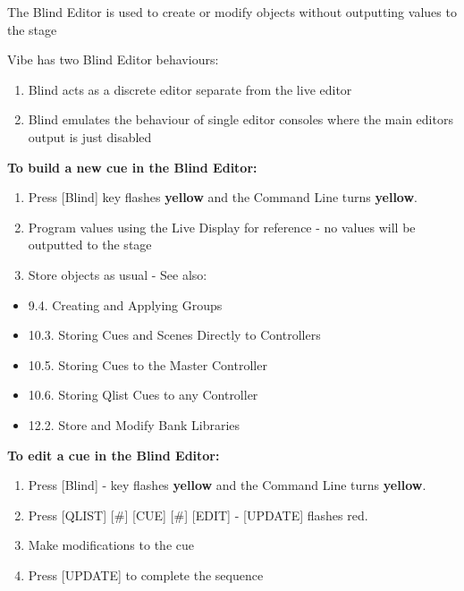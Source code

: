 \documentclass[
]{article}
\begin{document}
The Blind Editor is used to create or modify objects without outputting values to the stage

Vibe has two Blind Editor behaviours:

\begin{enumerate}
\def\labelenumi{\arabic{enumi}.}
\item
  Blind acts as a discrete editor separate from the live editor
\item
  Blind emulates the behaviour of single editor consoles where the main editors output is just disabled
\end{enumerate}

\textbf{To build a new cue in the Blind Editor:}

\begin{enumerate}
\def\labelenumi{\arabic{enumi}.}
\item
  Press {[}Blind{]} key flashes \textbf{{yellow}} and the Command Line turns \textbf{yellow}.
\item
  Program values using the Live Display for reference - no values will be outputted to the stage
\item
  Store objects as usual - See also:
\end{enumerate}

\begin{itemize}
\item
  9.4. Creating and Applying Groups
\item
  10.3. Storing Cues and Scenes Directly to Controllers
\item
  10.5. Storing Cues to the Master Controller
\item
  10.6. Storing Qlist Cues to any Controller
\item
  12.2. Store and Modify Bank Libraries
\end{itemize}

\textbf{To edit a cue in the Blind Editor:}

\begin{enumerate}
\def\labelenumi{\arabic{enumi}.}
\item
  Press {[}Blind{]} - key flashes \textbf{{yellow}} and the Command Line turns \textbf{yellow}.
\item
  Press {[}QLIST{]} {[}\#{]} {[}CUE{]} {[}\#{]} {[}EDIT{]} - {[}UPDATE{]} flashes {red}.
\item
  Make modifications to the cue
\item
  Press {[}UPDATE{]} to complete the sequence
\end{enumerate}
\end{document}
